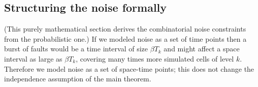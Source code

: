 \documentclass[11pt]{memoir}
\theoremstyle{definition} %
\renewcommand{\le}{\leq}
\def\B{B}
\newcommand{\Tu}{T}
\begin{document}




\subsection{Structuring the noise formally}\label{sec:sparsity}

(This purely mathematical section derives the combinatorial noise
constraints from the probabilistic one.)
If we modeled noise as a set of time points then a burst of faults would be a time
interval of size \( \beta\Tu_{k} \) and might affect a space interval as large as \( \beta\Tu_{k} \),
covering many times more simulated cells of level \( k \).
Therefore we model noise as a set of space-time points; this does not change the independence
assumption of the main theorem.
\end{document}
